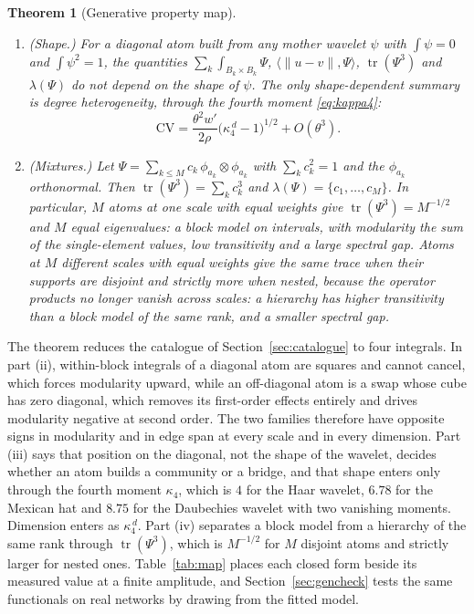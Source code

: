 \documentclass[11pt]{article}
\newtheorem{theorem}{Theorem}[section]
\theoremstyle{definition}
\newcommand{\1}{\mathbf 1}\newcommand{\op}{\operatorname}
\begin{document}
\begin{theorem}[Generative property map]
\begin{enumerate}[label=\textup{(\roman*)},leftmargin=*,itemsep=2pt]
\begin{enumerate}[label=\textup{(\alph*)},leftmargin=*]
boxes are separated by more than an average pair, $\Delta>\mu$.
\end{enumerate}
\item \textup{(Shape.)} For a diagonal atom built from any mother wavelet $\psi$ with $\int\psi=0$
and $\int\psi^{2}=1$, the quantities $\sum_k\int_{B_k\times B_k}\Psi$,
$\langle\|u-v\|,\Psi\rangle$, $\operatorname{tr}(\Psi^{3})$ and
$\lambda(\Psi)$ do not depend on the shape of $\psi$.  The only
shape-dependent summary is degree heterogeneity, through the fourth moment
\eqref{eq:kappa4}:
\[
\mathrm{CV}=\frac{\theta^{2}w'}{2\rho}\bigl(\kappa_4^{\,d}-1\bigr)^{1/2}+O(\theta^{3}).
\]
\item \textup{(Mixtures.)} Let $\Psi=\sum_{k\le M}c_k\,\phi_{a_k}\otimes\phi_{a_k}$ with
$\sum_kc_k^{2}=1$ and the $\phi_{a_k}$ orthonormal.  Then
$\operatorname{tr}(\Psi^{3})=\sum_kc_k^{3}$ and
$\lambda(\Psi)=\{c_1,\dots,c_M\}$.  In particular, $M$ atoms at one scale
with equal weights give $\operatorname{tr}(\Psi^{3})=M^{-1/2}$ and $M$ equal
eigenvalues: a block model on intervals, with modularity the sum of the
single-element values, low transitivity and a large spectral gap.  Atoms at
$M$ different scales with equal weights give the same trace when their supports
are disjoint and strictly more when nested, because the operator products no
longer vanish across scales: a hierarchy has higher transitivity than a block
model of the same rank, and a smaller spectral gap.
\end{enumerate}
\end{theorem}

The theorem reduces the catalogue of Section~\ref{sec:catalogue} to four
integrals.  In part (ii), within-block integrals of a diagonal atom are
squares and cannot cancel, which forces modularity upward, while an
off-diagonal atom is a swap whose cube has zero diagonal, which removes its
first-order effects entirely and drives modularity negative at second order.
The two families therefore have opposite signs in modularity and in edge
span at every scale and in every dimension.  Part (iii) says that position on
the diagonal, not the shape of the wavelet, decides whether an atom builds a
community or a bridge, and that shape enters only through the fourth moment
$\kappa_4$, which is $4$ for the Haar wavelet, $6.78$ for the Mexican hat and
$8.75$ for the Daubechies wavelet with two vanishing moments.  Dimension
enters as $\kappa_4^{\,d}$.  Part (iv) separates a block model from a
hierarchy of the same rank through $\operatorname{tr}(\Psi^3)$, which is
$M^{-1/2}$ for $M$ disjoint atoms and strictly larger for nested ones.
Table~\ref{tab:map} places each closed form beside its measured value at a
finite amplitude, and Section~\ref{sec:gencheck} tests the same functionals
on real networks by drawing from the fitted model.
\end{document}
